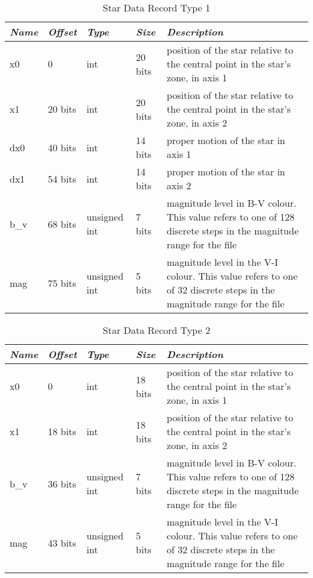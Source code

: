 \begin{table}[htbp]
\begin{tabularx}{\textwidth}{llllX}\toprule
\emph{Name} & \emph{Offset}& \emph{Type} & \emph{Size} &\emph{Description}\\\midrule
x0   &  0      & int          & 20 bits & position of the star relative to the central point in the star's zone, in axis 1\\%
x1   & 20 bits & int          & 20 bits & position of the star relative to the central point in the star's zone, in axis 2\\%
dx0  & 40 bits & int          & 14 bits & proper motion of the star in axis 1\\%
dx1  & 54 bits & int          & 14 bits & proper motion of the star in axis 2\\%
b\_v & 68 bits & unsigned int &  7 bits & magnitude level in B-V colour. This value refers to one of 128 discrete steps 
                                          in the magnitude range for the file\\%
mag  & 75 bits & unsigned int &  5 bits & magnitude level in the V-I colour. This value refers to one of 32 discrete steps 
                                          in the magnitude range for the file\\\bottomrule
\end{tabularx}
\caption{Star Data Record Type 1}
\label{tab:StarDataRecord1}
\end{table}

\begin{table}[htbp]
\begin{tabularx}{\textwidth}{llllX}\toprule
\emph{Name} & \emph{Offset} & \emph{Type} & \emph{Size} & \emph{Description}\\\midrule
x0   & 0       & int          & 18 bits & position of the star relative to the central point in the star's zone, in axis 1\\%
x1   & 18 bits & int          & 18 bits & position of the star relative to the central point in the star's zone, in axis 2\\%
b\_v & 36 bits & unsigned int &  7 bits & magnitude level in B-V colour. This value refers to one of 128 discrete steps 
                                          in the magnitude range for the file\\%
mag  & 43 bits & unsigned int &  5 bits & magnitude level in the V-I colour. This value refers to one of 32 discrete steps 
                                          in the magnitude range for the file\\\bottomrule
\end{tabularx}
\caption{Star Data Record Type 2}
\label{tab:StarDataRecord2}
\end{table}

